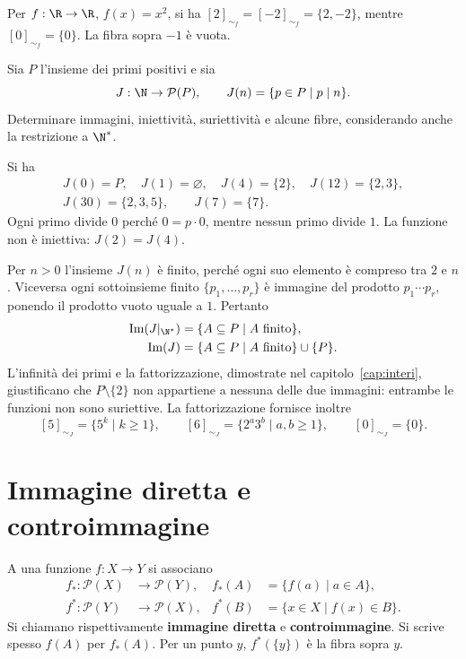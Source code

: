 \begin{esempio}
Per $f:\R\to\R$, $f(x)=x^2$, si ha $[2]_{\sim_f}=[-2]_{\sim_f}=\{2,-2\}$, mentre $[0]_{\sim_f}=\{0\}$. La fibra sopra $-1$ è vuota.
\end{esempio}

\begin{esercizio}
Sia $P$ l'insieme dei primi positivi e sia
\[
J:\N\to\mathcal P(P),\qquad J(n)=\{p\in P\mid p\mid n\}.
\]
Determinare immagini, iniettività, suriettività e alcune fibre, considerando anche la restrizione a $\N^*$.
\end{esercizio}
\begin{svolgimento}
Si ha
\[
\begin{gathered}
J(0)=P,\quad J(1)=\varnothing,\quad J(4)=\{2\},\quad J(12)=\{2,3\},\\
J(30)=\{2,3,5\},\qquad J(7)=\{7\}.
\end{gathered}
\]
Ogni primo divide $0$ perché $0=p\cdot0$, mentre nessun primo divide $1$. La funzione non è iniettiva: $J(2)=J(4)$.

Per $n>0$ l'insieme $J(n)$ è finito, perché ogni suo elemento è compreso tra $2$ e $n$. Viceversa ogni sottoinsieme finito $\{p_1,\ldots,p_r\}$ è immagine del prodotto $p_1\cdots p_r$, ponendo il prodotto vuoto uguale a $1$. Pertanto
\[
\begin{aligned}
\operatorname{Im}(J|_{\N^*})&=\{A\subseteq P\mid A\text{ finito}\},\\
\operatorname{Im}(J)&=\{A\subseteq P\mid A\text{ finito}\}\cup\{P\}.
\end{aligned}
\]
L'infinità dei primi e la fattorizzazione, dimostrate nel capitolo~\ref{cap:interi}, giustificano che $P\setminus\{2\}$ non appartiene a nessuna delle due immagini: entrambe le funzioni non sono suriettive. La fattorizzazione fornisce inoltre
\[
[5]_{\sim_J}=\{5^k\mid k\ge1\},\qquad
[6]_{\sim_J}=\{2^a3^b\mid a,b\ge1\},\qquad [0]_{\sim_J}=\{0\}.
\]
\end{svolgimento}

\section{Immagine diretta e controimmagine}
\begin{definizione}
A una funzione $f:X\to Y$ si associano
\[
\begin{aligned}
f_*:\mathcal P(X)&\to\mathcal P(Y),&f_*(A)&=\{f(a)\mid a\in A\},\\
f^*:\mathcal P(Y)&\to\mathcal P(X),&f^*(B)&=\{x\in X\mid f(x)\in B\}.
\end{aligned}
\]
Si chiamano rispettivamente \textbf{immagine diretta} e \textbf{controimmagine}. Si scrive spesso $f(A)$ per $f_*(A)$. Per un punto $y$, $f^*(\{y\})$ è la fibra sopra $y$.
\end{definizione}

